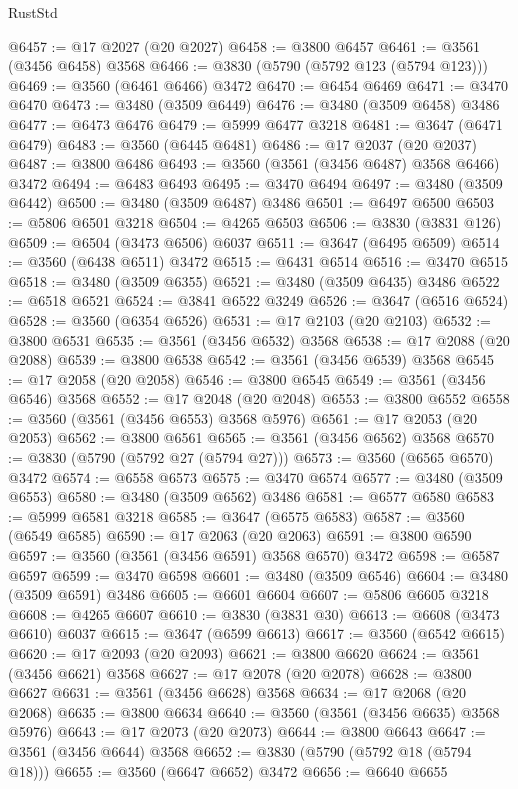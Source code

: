 \begin{lexlean}{RustStd}
\begin{coremodule}
@6457 := @17 @2027 (@20 @2027)
@6458 := @3800 @6457
@6461 := @3561 (@3456 @6458) @3568
@6466 := @3830 (@5790 (@5792 @123 (@5794 @123)))
@6469 := @3560 (@6461 @6466) @3472
@6470 := @6454 @6469
@6471 := @3470 @6470
@6473 := @3480 (@3509 @6449)
@6476 := @3480 (@3509 @6458) @3486
@6477 := @6473 @6476
@6479 := @5999 @6477 @3218
@6481 := @3647 (@6471 @6479)
@6483 := @3560 (@6445 @6481)
@6486 := @17 @2037 (@20 @2037)
@6487 := @3800 @6486
@6493 := @3560 (@3561 (@3456 @6487) @3568 @6466) @3472
@6494 := @6483 @6493
@6495 := @3470 @6494
@6497 := @3480 (@3509 @6442)
@6500 := @3480 (@3509 @6487) @3486
@6501 := @6497 @6500
@6503 := @5806 @6501 @3218
@6504 := @4265 @6503
@6506 := @3830 (@3831 @126)
@6509 := @6504 (@3473 @6506) @6037
@6511 := @3647 (@6495 @6509)
@6514 := @3560 (@6438 @6511) @3472
@6515 := @6431 @6514
@6516 := @3470 @6515
@6518 := @3480 (@3509 @6355)
@6521 := @3480 (@3509 @6435) @3486
@6522 := @6518 @6521
@6524 := @3841 @6522 @3249
@6526 := @3647 (@6516 @6524)
@6528 := @3560 (@6354 @6526)
@6531 := @17 @2103 (@20 @2103)
@6532 := @3800 @6531
@6535 := @3561 (@3456 @6532) @3568
@6538 := @17 @2088 (@20 @2088)
@6539 := @3800 @6538
@6542 := @3561 (@3456 @6539) @3568
@6545 := @17 @2058 (@20 @2058)
@6546 := @3800 @6545
@6549 := @3561 (@3456 @6546) @3568
@6552 := @17 @2048 (@20 @2048)
@6553 := @3800 @6552
@6558 := @3560 (@3561 (@3456 @6553) @3568 @5976)
@6561 := @17 @2053 (@20 @2053)
@6562 := @3800 @6561
@6565 := @3561 (@3456 @6562) @3568
@6570 := @3830 (@5790 (@5792 @27 (@5794 @27)))
@6573 := @3560 (@6565 @6570) @3472
@6574 := @6558 @6573
@6575 := @3470 @6574
@6577 := @3480 (@3509 @6553)
@6580 := @3480 (@3509 @6562) @3486
@6581 := @6577 @6580
@6583 := @5999 @6581 @3218
@6585 := @3647 (@6575 @6583)
@6587 := @3560 (@6549 @6585)
@6590 := @17 @2063 (@20 @2063)
@6591 := @3800 @6590
@6597 := @3560 (@3561 (@3456 @6591) @3568 @6570) @3472
@6598 := @6587 @6597
@6599 := @3470 @6598
@6601 := @3480 (@3509 @6546)
@6604 := @3480 (@3509 @6591) @3486
@6605 := @6601 @6604
@6607 := @5806 @6605 @3218
@6608 := @4265 @6607
@6610 := @3830 (@3831 @30)
@6613 := @6608 (@3473 @6610) @6037
@6615 := @3647 (@6599 @6613)
@6617 := @3560 (@6542 @6615)
@6620 := @17 @2093 (@20 @2093)
@6621 := @3800 @6620
@6624 := @3561 (@3456 @6621) @3568
@6627 := @17 @2078 (@20 @2078)
@6628 := @3800 @6627
@6631 := @3561 (@3456 @6628) @3568
@6634 := @17 @2068 (@20 @2068)
@6635 := @3800 @6634
@6640 := @3560 (@3561 (@3456 @6635) @3568 @5976)
@6643 := @17 @2073 (@20 @2073)
@6644 := @3800 @6643
@6647 := @3561 (@3456 @6644) @3568
@6652 := @3830 (@5790 (@5792 @18 (@5794 @18)))
@6655 := @3560 (@6647 @6652) @3472
@6656 := @6640 @6655

\end{coremodule}
\end{lexlean}
